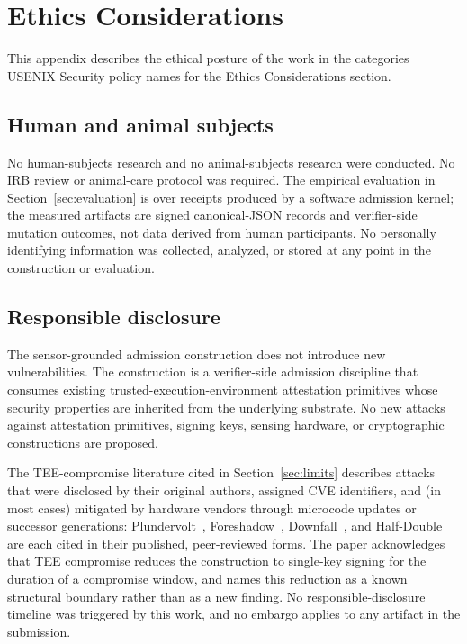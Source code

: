 \section{Ethics Considerations}
\label{sec:ethics}

This appendix describes the ethical posture of the work in the
categories USENIX Security policy names for the Ethics Considerations
section.

\subsection{Human and animal subjects}

No human-subjects research and no animal-subjects research were
conducted. No IRB review or animal-care protocol was required. The
empirical evaluation in Section~\ref{sec:evaluation} is over receipts
produced by a software admission kernel; the measured artifacts are
signed canonical-JSON records and verifier-side mutation outcomes, not
data derived from human participants. No personally identifying
information was collected, analyzed, or stored at any point in the
construction or evaluation.

\subsection{Responsible disclosure}

The sensor-grounded admission construction does not introduce new
vulnerabilities. The construction is a verifier-side admission
discipline that consumes existing trusted-execution-environment
attestation primitives whose security properties are inherited from
the underlying substrate. No new attacks against attestation
primitives, signing keys, sensing hardware, or cryptographic
constructions are proposed.

The TEE-compromise literature cited in Section~\ref{sec:limits}
describes attacks that were disclosed by their original authors,
assigned CVE identifiers, and (in most cases) mitigated by hardware
vendors through microcode updates or successor generations:
Plundervolt~\cite{murdockPlundervolt2020},
Foreshadow~\cite{vanbulckForeshadow2018},
Downfall~\cite{moghimiDownfall2024}, and
Half-Double~\cite{koglerHalfDouble2022} are each cited in their
published, peer-reviewed forms. The paper acknowledges that TEE
compromise reduces the construction to single-key signing for the
duration of a compromise window, and names this reduction as a known
structural boundary rather than as a new finding. No
responsible-disclosure timeline was triggered by this work, and no
embargo applies to any artifact in the submission.

